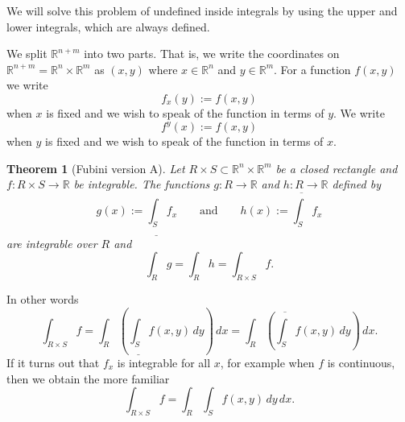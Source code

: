 \documentclass[12pt]{book}
\newcommand{\R}{{\mathbb{R}}}
\theoremstyle{plain}
\newtheorem{thm}{Theorem}[section]
\theoremstyle{remark}
\theoremstyle{definition}
\theoremstyle{exercise}
\theoremstyle{example}
\begin{document}
We will solve this problem of undefined inside integrals
by using the upper and lower integrals, which are always defined.

\medskip

We split $\R^{n+m}$ into two parts.  That is,
we write the coordinates on $\R^{n+m} = \R^n \times \R^m$ as
$(x,y)$ where $x \in \R^n$ and $y \in \R^m$.  For a function $f(x,y)$
we write
\begin{equation*}
f_x(y) := f(x,y)
\end{equation*}
when $x$ is fixed and we wish to speak of the function in terms of $y$.
We write
\begin{equation*}
f^y(x) := f(x,y)
\end{equation*}
when $y$ is fixed and we wish to speak of the function in terms of $x$.

\begin{thm}[Fubini version A] \label{mv:fubinivA}
Let $R \times S \subset \R^n \times \R^m$ be a closed rectangle and
$f \colon R \times S \to \R$ be integrable.
The functions $g \colon R \to \R$ and $h \colon R \to \R$ defined by
\begin{equation*}
g(x) := \underline{\int_S} f_x \qquad
\text{and} \qquad
h(x) := \overline{\int_S} f_x 
\end{equation*}
are integrable over $R$ and
\begin{equation*}
\int_R g = \int_R h = \int_{R \times S} f .
\end{equation*}
\end{thm}

In other words
\begin{equation*}
\int_{R \times S} f
=
 \int_R \left(
 \underline{\int_S} f(x,y) \, dy
\right) \, dx
=
 \int_R \left(
 \overline{\int_S} f(x,y) \, dy
\right) \, dx .
\end{equation*}
If it turns out that $f_x$ is integrable for all $x$, for example when
$f$ is continuous, then we obtain the more familiar
\begin{equation*}
\int_{R \times S} f
=
 \int_R \int_S f(x,y) \, dy \, dx .
\end{equation*}
\end{document}

